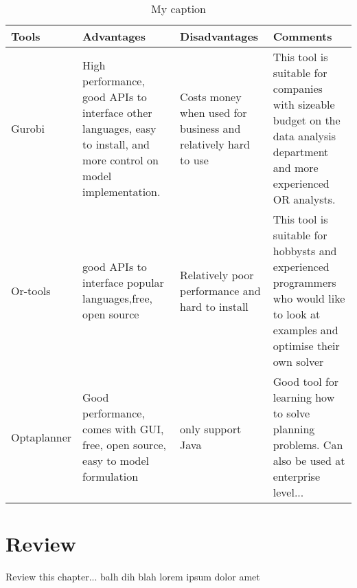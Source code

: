 \begin{table}[!ht]
\centering
\caption{My caption}
\label{my-label}
\begin{tabular}{|l|p{}|p{}|p{}|}
\hline
Tools       & Advantages & Disadvantages & Comments \\ \hline
Gurobi      & High performance, good APIs to interface other languages, easy to install, and more control on model implementation.
            & Costs money when used for business and relatively hard to use
            & This tool is suitable for companies with sizeable budget on the data analysis department and more experienced OR analysts. \\ \hline
Or-tools    & good APIs to interface popular languages,free, open source  &  Relatively poor performance and hard to install  & This tool is suitable for hobbysts and experienced programmers who would like to look at examples and optimise their own solver\\ \hline
Optaplanner &  Good performance, comes with GUI, free, open source, easy to model formulation &     only support Java     & Good tool for learning how to solve planning problems. Can also be used at enterprise level...  \\ \hline
\end{tabular}
\end{table}

\section{Review}
Review this chapter... balh dih blah lorem ipsum dolor amet
